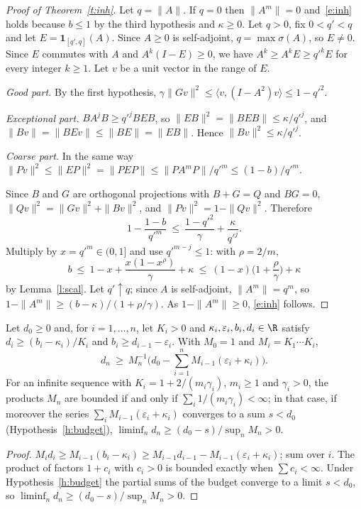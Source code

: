 \begin{proof}[Proof of Theorem~\ref{t:inh}]
Let $q=\|A\|$. If $q=0$ then $\|A^m\|=0$ and~\eqref{e:inh} holds because $b\le1$ by the third hypothesis and
$\kappa\ge0$. Let $q>0$, fix $0<q'<q$ and let $E=\mathbf 1_{[q',q]}(A)$. Since $A\ge0$ is self-adjoint, $q=\max\sigma(A)$, so $E\ne0$. Since $E$ commutes
with $A$ and $A^k(I-E)\ge0$, we have $A^k\ge A^kE\ge q'^kE$ for every integer $k\ge1$. Let $v$ be a unit
vector in the range of $E$.

\emph{Good part.} By the first hypothesis, $\gamma\|Gv\|^2\le\langle v,(I-A^2)v\rangle\le1-q'^2$.

\emph{Exceptional part.} $BA^jB\ge q'^jBEB$, so $\|EB\|^2=\|BEB\|\le\kappa/q'^j$, and
$\|Bv\|=\|BEv\|\le\|BE\|=\|EB\|$. Hence $\|Bv\|^2\le\kappa/q'^j$.

\emph{Coarse part.} In the same way $\|Pv\|^2\le\|EP\|^2=\|PEP\|\le\|PA^mP\|/q'^m\le(1-b)/q'^m$.

Since $B$ and $G$ are orthogonal projections with $B+G=Q$ and $BG=0$, $\|Qv\|^2=\|Gv\|^2+\|Bv\|^2$, and
$\|Pv\|^2=1-\|Qv\|^2$. Therefore
\[
1-\frac{1-b}{q'^m}\ \le\ \frac{1-q'^2}{\gamma}+\frac{\kappa}{q'^j} .
\]
Multiply by $x=q'^m\in(0,1]$ and use $q'^{m-j}\le1$: with $\rho=2/m$,
\[
b\ \le\ 1-x+\frac{x(1-x^{\rho})}{\gamma}+\kappa\ \le\ (1-x)\Big(1+\frac{\rho}{\gamma}\Big)+\kappa
\]
by Lemma~\ref{l:scal}. Let $q'\uparrow q$; since $A$ is self-adjoint, $\|A^m\|=q^m$, so
$1-\|A^m\|\ge(b-\kappa)/(1+\rho/\gamma)$. As $1-\|A^m\|\ge0$, \eqref{e:inh} follows.
\end{proof}

\begin{corollary}[Accumulation]\label{c:acc}
Let $d_0\ge0$ and, for $i=1,\dots,n$, let $K_i>0$ and $\kappa_i,\varepsilon_i,b_i,d_i\in\R$ satisfy
$d_i\ge(b_i-\kappa_i)/K_i$ and $b_i\ge d_{i-1}-\varepsilon_i$. With $M_0=1$ and $M_i=K_1\cdots K_i$,
\[
d_n\ \ge\ M_n^{-1}\Big(d_0-\sum_{i=1}^nM_{i-1}(\varepsilon_i+\kappa_i)\Big).
\]
For an infinite sequence with $K_i=1+2/(m_i\gamma_i)$, $m_i\ge1$ and $\gamma_i>0$, the products $M_n$ are
bounded if and only if $\sum_i1/(m_i\gamma_i)<\infty$; in that case, if moreover the series $\sum_iM_{i-1}(\varepsilon_i+\kappa_i)$ converges to a sum $s<d_0$
(Hypothesis~\ref{h:budget}), $\liminf_nd_n\ge(d_0-s)/\sup_nM_n>0$.
\end{corollary}
\begin{proof}
$M_id_i\ge M_{i-1}(b_i-\kappa_i)\ge M_{i-1}d_{i-1}-M_{i-1}(\varepsilon_i+\kappa_i)$; sum over $i$. The product of
factors $1+c_i$ with $c_i>0$ is bounded exactly when $\sum c_i<\infty$. Under Hypothesis~\ref{h:budget} the
partial sums of the budget converge to a limit $s<d_0$, so $\liminf_nd_n\ge(d_0-s)/\sup_nM_n>0$.
\end{proof}

